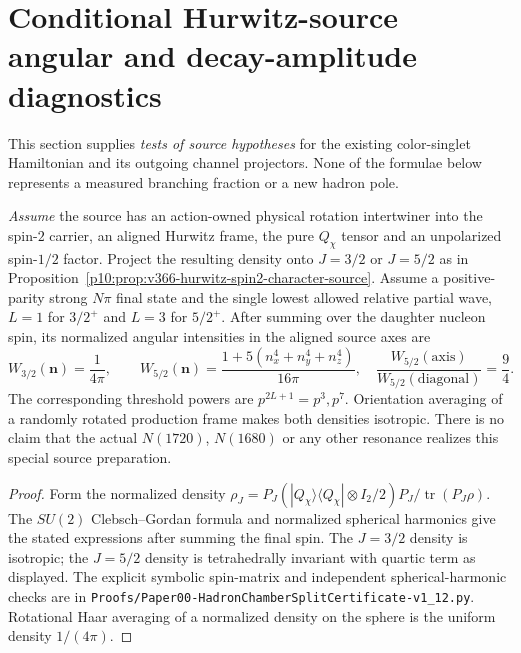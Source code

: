 \documentclass[12pt,a4paper]{article}
\begin{document}
\section{Conditional Hurwitz-source angular and decay-amplitude diagnostics}
\label{p11:sec:v366-hurwitz-decay-diagnostics}
This section supplies \emph{tests of source hypotheses} for the
existing color-singlet Hamiltonian and its outgoing channel
projectors.  None of the formulae below represents a measured
branching fraction or a new hadron pole.

\begin{proposition}
\label{p11:prop:v366-prepared-hurwitz-angular-law}
\emph{Assume} the source has an action-owned physical rotation
intertwiner into the spin-$2$ carrier, an aligned Hurwitz frame,
the pure $Q_{\chi}$ tensor and an unpolarized spin-$1/2$ factor.
Project the resulting density onto $J=3/2$ or $J=5/2$ as in
Proposition~\ref{p10:prop:v366-hurwitz-spin2-character-source}.
Assume a positive-parity strong $N\pi$ final state and the single
lowest allowed relative partial wave, $L=1$ for $3/2^+$ and $L=3$
for $5/2^+$.  After summing over the daughter nucleon spin,
its normalized angular intensities in the aligned source axes are
\[
 \boxed{W_{3/2}(\mathbf n)=\frac1{4\pi},\qquad
 W_{5/2}(\mathbf n)=
 \frac{1+5(n_x^4+n_y^4+n_z^4)}{16\pi}},\quad
 \frac{W_{5/2}(\mathrm{axis})}{W_{5/2}(\mathrm{diagonal})}
 =\frac94.
\]
The corresponding threshold powers are $p^{2L+1}=p^3,p^7$.
Orientation averaging of a randomly rotated production frame
makes both densities isotropic.  There is no claim that the actual
$N(1720)$, $N(1680)$ or any other resonance realizes this
special source preparation.
\end{proposition}
\begin{proof}
Form the normalized density
$\rho_J=P_J(|Q_{\chi}\rangle\langle Q_{\chi}|
 \otimes I_2/2)P_J/\operatorname{tr}(P_J\rho)$.
The $SU(2)$ Clebsch--Gordan formula and normalized spherical
harmonics give the stated expressions after summing the final
spin.  The $J=3/2$ density is isotropic; the $J=5/2$ density is
tetrahedrally invariant with quartic term as displayed.
The explicit symbolic spin-matrix and independent spherical-harmonic
checks are in \texttt{Proofs/Paper00-HadronChamberSplitCertificate-v1\_12.py}.
Rotational Haar averaging of a normalized density on the sphere
is the uniform density $1/(4\pi)$.
\end{proof}
\end{document}
